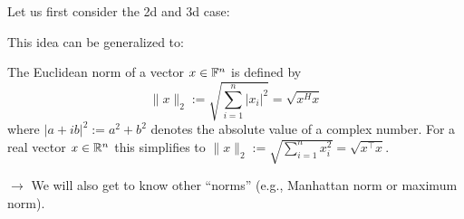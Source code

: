 \begin{frame} 
Let us first consider the 2d and 3d case:\\

This idea can be generalized to: \vspace{-0.25cm}
\begin{defi} 
	The Euclidean norm of a vector $x\in {\mathbb{F}}^n$ is defined by $$\|x\|_2 := \sqrt{\sum_{i=1}^n |x_i|^2}= \sqrt{x^H x} $$
	where $|a+ib|^2 := a^2+b^2$ denotes the absolute value of a complex number.
	For a real vector $x\in {\mathbb{R}}^n$ this simplifies to
	$\|x\|_2 := \sqrt{\sum_{i=1}^n x_i^2}= \sqrt{x^\top x}. $
\end{defi}
\small
{ $\rightarrow$ We will also get to know other ``norms'' (e.g., Manhattan norm or maximum norm).}\\


\end{frame}
